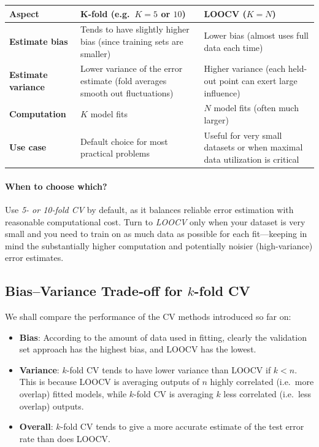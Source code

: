 \documentclass{article}
\begin{document}
\pagebreak

\begin{table}[ht]
  \centering
  \begin{tabular}{@{}p{3cm}p{5.5cm}p{5.5cm}@{}}
    \toprule
    \textbf{Aspect} & \textbf{K-fold (e.g.\ \(K=5\) or \(10\))} & \textbf{LOOCV (\(K=N\))} \\
    \midrule
    \textbf{Estimate bias} &
      Tends to have slightly higher bias (since training sets are smaller) &
      Lower bias (almost uses full data each time) \\
    \addlinespace
    \textbf{Estimate variance} &
      Lower variance of the error estimate (fold averages smooth out fluctuations) &
      Higher variance (each held-out point can exert large influence) \\
    \addlinespace
    \textbf{Computation} &
      \(K\) model fits &
      \(N\) model fits (often much larger) \\
    \addlinespace
    \textbf{Use case} &
      Default choice for most practical problems &
      Useful for very small datasets or when maximal data utilization is critical \\
    \bottomrule
  \end{tabular}
\end{table}
\paragraph{When to choose which?}
Use \emph{5- or 10-fold CV} by default, as it balances reliable error estimation with reasonable computational cost. Turn to \emph{LOOCV} only when your dataset is very small and you need to train on as much data as possible for each fit—keeping in mind the substantially higher computation and potentially noisier (high-variance) error estimates.

\subsection{Bias–Variance Trade‐off for \(k\)-fold CV}

We shall compare the performance of the CV methods introduced so far on:
\begin{itemize}
  \item \textbf{Bias}:  
    According to the amount of data used in fitting, clearly the validation set approach has the highest bias, and LOOCV has the lowest.
  \item \textbf{Variance}:  
    \(k\)-fold CV tends to have lower variance than LOOCV if \(k<n\). This is because LOOCV is averaging outputs of \(n\) highly correlated (i.e.\ more overlap) fitted models, while \(k\)-fold CV is averaging \(k\) less correlated (i.e.\ less overlap) outputs.
  \item \textbf{Overall}:  
    \(k\)-fold CV tends to give a more accurate estimate of the test error rate than does LOOCV.
\end{itemize}
\end{document}
